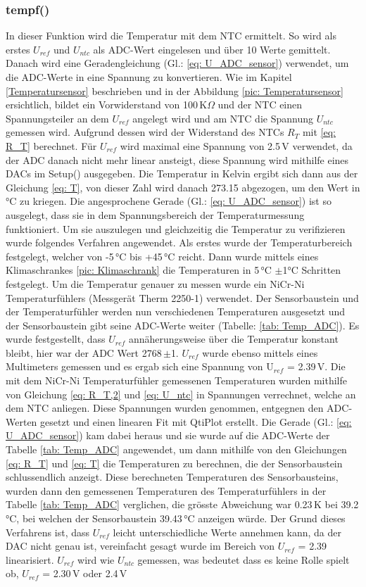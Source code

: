 \subsubsection{tempf()} \label{tempf}
In dieser Funktion wird die Temperatur mit dem NTC ermittelt. So wird als erstes $U_{ref}$ und $U_{ntc}$ als ADC-Wert eingelesen und über 10 Werte gemittelt. Danach wird eine Geradengleichung (Gl.: \ref{eq: U_ADC_sensor}) verwendet, um die ADC-Werte in eine Spannung zu konvertieren. Wie im Kapitel \ref{Temperatursensor} beschrieben und in der Abbildung \ref{pic: Temperatursensor} ersichtlich, bildet ein Vorwiderstand von 100\,K$\Omega$ und der NTC einen Spannungsteiler an dem $U_{ref}$ angelegt wird und am NTC die Spannung $U_{ntc}$ gemessen wird. Aufgrund dessen wird der Widerstand des NTCs $R_T$ mit \ref{eq: R_T} berechnet. Für $U_{ref}$ wird maximal eine Spannung von 2.5\,V verwendet, da der ADC danach nicht mehr linear ansteigt, diese Spannung wird mithilfe eines DACs im Setup() ausgegeben. Die Temperatur in Kelvin ergibt sich dann aus der Gleichung \ref{eq: T}, von dieser Zahl wird danach 273.15 abgezogen, um den Wert in °C zu kriegen. Die angesprochene Gerade (Gl.: \ref{eq: U_ADC_sensor}) ist so ausgelegt, dass sie in dem Spannungsbereich der Temperaturmessung funktioniert. Um sie auszulegen und gleichzeitig die Temperatur zu verifizieren wurde folgendes Verfahren angewendet. Als erstes wurde der Temperaturbereich festgelegt, welcher von -5\,°C bis +45\,°C reicht. Dann wurde mittels eines Klimaschrankes \ref{pic: Klimaschrank} die Temperaturen in 5\,°C $\pm$1°C Schritten festgelegt. Um die Temperatur genauer zu messen wurde ein NiCr-Ni Temperaturfühlers (Messgerät Therm 2250-1) verwendet. Der Sensorbaustein und der Temperaturfühler werden nun verschiedenen Temperaturen ausgesetzt und der Sensorbaustein gibt seine ADC-Werte weiter (Tabelle: \ref{tab: Temp_ADC}). Es wurde festgestellt, dass $U_{ref}$ annäherungsweise über die Temperatur konstant bleibt, hier war der ADC Wert 2768\,$\pm$1. $U_{ref}$ wurde ebenso mittels eines Multimeters gemessen und es ergab sich eine Spannung von U$_{ref}$ = 2.39\,V. Die mit dem NiCr-Ni Temperaturfühler gemessenen Temperaturen wurden mithilfe von Gleichung \ref{eq: R_T,2} und \ref{eq: U_ntc} in Spannungen verrechnet, welche an dem NTC anliegen. Diese Spannungen wurden genommen, entgegnen den ADC-Werten gesetzt und einen linearen Fit mit QtiPlot erstellt. Die Gerade (Gl.: \ref{eq: U_ADC_sensor}) kam dabei heraus und sie wurde auf die ADC-Werte der Tabelle \ref{tab: Temp_ADC} angewendet, um dann mithilfe von den Gleichungen \ref{eq: R_T} und \ref{eq: T} die Temperaturen zu berechnen, die der Sensorbaustein schlussendlich anzeigt. Diese berechneten Temperaturen des Sensorbausteins, wurden dann den gemessenen Temperaturen des Temperaturfühlers in der Tabelle \ref{tab: Temp_ADC} verglichen, die grösste Abweichung war 0.23\,K bei 39.2\,°C, bei welchen der Sensorbaustein 39.43\,°C anzeigen würde. Der Grund dieses Verfahrens ist, dass $U_{ref}$ leicht unterschiedliche Werte annehmen kann, da der DAC nicht genau ist, vereinfacht gesagt wurde im Bereich von $U_{ref}$ = 2.39\, linearisiert. $U_{ref}$ wird wie $U_{ntc}$ gemessen, was bedeutet dass es keine Rolle spielt ob, $U_{ref}$ = 2.30\,V oder 2.4\,V 